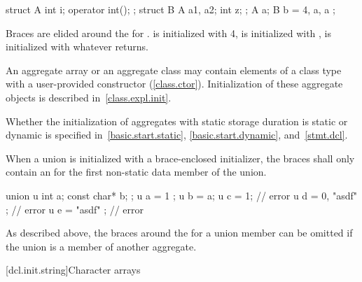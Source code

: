 \begin{example}

\begin{codeblock}
struct A {
  int i;
  operator int();
};
struct B {
  A a1, a2;
  int z;
};
A a;
B b = { 4, a, a };
\end{codeblock}

Braces are elided around the
for
.
is initialized with 4,
is initialized with
,
is initialized with whatever
returns.
\end{example}

\pnum
{}%
\begin{note}
An aggregate array or an aggregate class may contain elements of a
class type with a user-provided constructor (\ref{class.ctor}).
Initialization of these aggregate objects is described in~\ref{class.expl.init}.
\end{note}

\pnum
\begin{note}
Whether the initialization of aggregates with static storage duration
is static or dynamic is specified
in~\ref{basic.start.static}, \ref{basic.start.dynamic}, and~\ref{stmt.dcl}.
\end{note}

\pnum
{}%
When a union is initialized with a brace-enclosed initializer,
the braces shall only contain an
for the first non-static data member of the union.
\begin{example}

\begin{codeblock}
union u { int a; const char* b; };
u a = { 1 };
u b = a;
u c = 1;                        // error
u d = { 0, "asdf" };            // error
u e = { "asdf" };               // error
\end{codeblock}
\end{example}

\pnum
\begin{note}
As described above,
the braces around the
for a union member can be omitted if the
union is a member of another aggregate.
\end{note}

[dcl.init.string]{Character arrays}%

